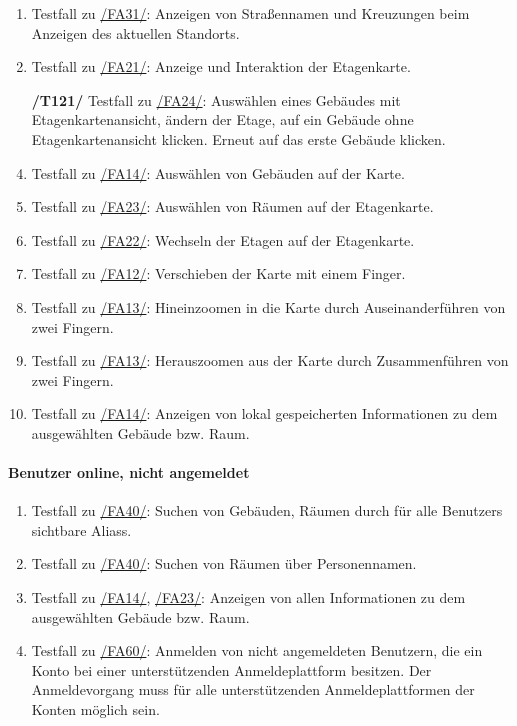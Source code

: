 \begin{enumerate}[label=\textbf{/T\arabic*0/}, align=left]
	\item \label{/T110/} Testfall zu \hyperref[/FA31/]{/FA31/}: Anzeigen von Straßennamen und Kreuzungen beim Anzeigen des aktuellen Standorts.
	\item \label{/T120/} Testfall zu \hyperref[/FA21/]{/FA21/}: Anzeige und Interaktion der \Gls{Etagenkarte}.
	\item[\textbf{/T121/}] \label{/T121/} Testfall zu \hyperref[/FA24/]{/FA24/}: Auswählen eines Gebäudes mit \Gls{Etagenkartenansicht}, ändern der Etage, auf ein Gebäude ohne \Gls{Etagenkartenansicht} klicken. Erneut auf das erste Gebäude klicken.
	\item \label{/T130/} Testfall zu \hyperref[/FA14/]{/FA14/}: Auswählen von Gebäuden auf der \Gls{Karte}.
	\item \label{/T140/} Testfall zu \hyperref[/FA23/]{/FA23/}: Auswählen von Räumen auf der \Gls{Etagenkarte}.
	\item \label{/T150/} Testfall zu \hyperref[/FA22/]{/FA22/}: Wechseln der Etagen auf der \Gls{Etagenkarte}.
	\item \label{/T160/} Testfall zu \hyperref[/FA12/]{/FA12/}: Verschieben der \Gls{Karte} mit einem Finger.
	\item \label{/T170/} Testfall zu \hyperref[/FA13/]{/FA13/}: Hineinzoomen in die \Gls{Karte} durch Auseinanderführen von zwei Fingern.
	\item \label{/T180/} Testfall zu \hyperref[/FA13/]{/FA13/}: Herauszoomen aus der \Gls{Karte} durch Zusammenführen von zwei Fingern.
	\item \label{/T190/} Testfall zu \hyperref[/FA14/]{/FA14/}: Anzeigen von \gls{lokal} gespeicherten Informationen zu dem ausgewählten Gebäude bzw. Raum.
\end{enumerate}

\paragraph{\Gls{Benutzer} online, nicht angemeldet}
\begin{enumerate}[label=\textbf{/T\arabic*0/}, align=left, resume]
	\item \label{/T200/} Testfall zu \hyperref[/FA40/]{/FA40/}: Suchen von Gebäuden, Räumen durch für alle \Glspl{Benutzer} sichtbare \Glspl{Alias}.
	\item \label{/T210/} Testfall zu \hyperref[/FA40/]{/FA40/}: Suchen von Räumen über Personennamen.
	\item \label{/T220/} Testfall zu \hyperref[/FA14/]{/FA14/}, \hyperref[/FA23/]{/FA23/}: Anzeigen von allen Informationen zu dem ausgewählten Gebäude bzw. Raum.
	\item \label{/T230/} Testfall zu \hyperref[/FA60/]{/FA60/}: Anmelden von nicht angemeldeten Benutzern, die ein Konto bei einer unterstützenden Anmeldeplattform besitzen. Der Anmeldevorgang muss für alle unterstützenden Anmeldeplattformen der Konten möglich sein.
\end{enumerate}

